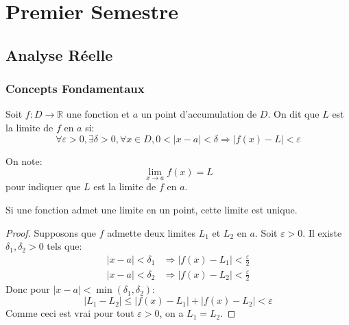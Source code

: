\documentclass[11pt,%
	fleqn,%
	a4paper,%
	twoside%
]{backagBook}
\begin{document}
\clearpage %

\mainmatter



\part{Premier Semestre}
\chapter{Analyse Réelle}

\section{Concepts Fondamentaux}

\begin{definition}
Soit $f: D \to \mathbb{R}$ une fonction et $a$ un point d'accumulation de $D$. On dit que $L$ est la limite de $f$ en $a$ si:
\[\forall \varepsilon > 0, \exists \delta > 0, \forall x \in D, 0 < |x-a| < \delta \Rightarrow |f(x)-L| < \varepsilon\]
\end{definition}

\begin{notation}
On note:
\[\lim_{x \to a} f(x) = L\]
pour indiquer que $L$ est la limite de $f$ en $a$.
\end{notation}

\begin{theorem}
Si une fonction admet une limite en un point, cette limite est unique.
\end{theorem}

\begin{proof}
Supposons que $f$ admette deux limites $L_1$ et $L_2$ en $a$.
Soit $\varepsilon > 0$. Il existe $\delta_1, \delta_2 > 0$ tels que:
\begin{align*}
|x-a| < \delta_1 &\Rightarrow |f(x)-L_1| < \frac{\varepsilon}{2} \\
|x-a| < \delta_2 &\Rightarrow |f(x)-L_2| < \frac{\varepsilon}{2}
\end{align*}
Donc pour $|x-a| < \min(\delta_1,\delta_2)$:
\[|L_1-L_2| \leq |f(x)-L_1| + |f(x)-L_2| < \varepsilon\]
Comme ceci est vrai pour tout $\varepsilon > 0$, on a $L_1 = L_2$.
\end{proof}
\end{document}
